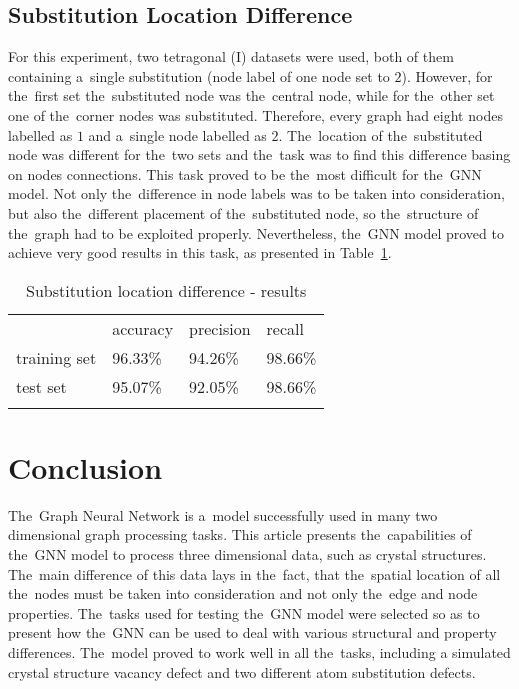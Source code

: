 \documentclass{llncs}
\begin{document}
\subsection{Substitution Location Difference}
For this experiment, two tetragonal (I) datasets were used, both of them containing a~single substitution (node label of one node set to $2$). However, for the~first set the~substituted node was the~central node, while for the~other set one of the~corner nodes was substituted. Therefore, every graph had eight nodes labelled as $1$ and a~single node labelled as $2$. The~location of the~substituted node was different for the~two sets and the~task was to find this difference basing on nodes connections. This task proved to be the~most difficult for the~GNN model. Not only the~difference in node labels was to be taken into consideration, but also the~different placement of the~substituted node, so the~structure of the~graph had to be exploited properly. Nevertheless, the~GNN model proved to achieve very good results in this task, as presented in Table~\ref{tab:substloc}.

\begin{table}[h!]
\begin{center}
\caption{Substitution location difference - results}
\begin{tabular}{llll}
\hline\noalign{\smallskip}
 & accuracy & precision & recall\\
\noalign{\smallskip}
\hline
\noalign{\smallskip}
training set & 96.33\% &  94.26\% & 98.66\% \\
test set & 95.07\% & 92.05\% & 98.66\% \\
\hline
\label{tab:substloc}
\end{tabular}
\end{center}
\end{table}

\section{Conclusion}
The~Graph Neural Network is a~model successfully used in many two dimensional graph processing tasks. This article presents the~capabilities of the~GNN model to process three dimensional data, such as crystal structures. The~main difference of this data lays in the~fact, that the~spatial location of all the~nodes must be taken into consideration and not only the~edge and node properties. The~tasks used for testing the~GNN model were selected so as to present how the~GNN can be used to deal with various structural and property differences. The~model proved to work well in all the~tasks, including a simulated crystal structure vacancy defect and two different atom substitution defects.



\end{document}
